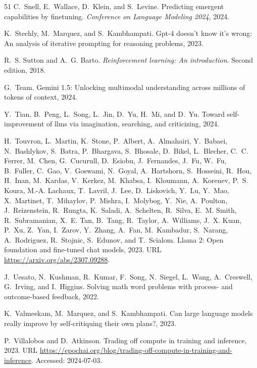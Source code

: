 \begin{thebibliography}{51}
C.~Snell, E.~Wallace, D.~Klein, and S.~Levine.
\newblock Predicting emergent capabilities by finetuning.
\newblock \emph{Conference on Language Modeling 2024}, 2024.

K.~Stechly, M.~Marquez, and S.~Kambhampati.
\newblock Gpt-4 doesn't know it's wrong: An analysis of iterative prompting for reasoning problems, 2023.

R.~S. Sutton and A.~G. Barto.
\newblock \emph{Reinforcement learning: An introduction}.
\newblock Second edition, 2018.

G.~Team.
\newblock Gemini 1.5: Unlocking multimodal understanding across millions of tokens of context, 2024.

Y.~Tian, B.~Peng, L.~Song, L.~Jin, D.~Yu, H.~Mi, and D.~Yu.
\newblock Toward self-improvement of llms via imagination, searching, and criticizing, 2024.

H.~Touvron, L.~Martin, K.~Stone, P.~Albert, A.~Almahairi, Y.~Babaei, N.~Bashlykov, S.~Batra, P.~Bhargava, S.~Bhosale, D.~Bikel, L.~Blecher, C.~C. Ferrer, M.~Chen, G.~Cucurull, D.~Esiobu, J.~Fernandes, J.~Fu, W.~Fu, B.~Fuller, C.~Gao, V.~Goswami, N.~Goyal, A.~Hartshorn, S.~Hosseini, R.~Hou, H.~Inan, M.~Kardas, V.~Kerkez, M.~Khabsa, I.~Kloumann, A.~Korenev, P.~S. Koura, M.-A. Lachaux, T.~Lavril, J.~Lee, D.~Liskovich, Y.~Lu, Y.~Mao, X.~Martinet, T.~Mihaylov, P.~Mishra, I.~Molybog, Y.~Nie, A.~Poulton, J.~Reizenstein, R.~Rungta, K.~Saladi, A.~Schelten, R.~Silva, E.~M. Smith, R.~Subramanian, X.~E. Tan, B.~Tang, R.~Taylor, A.~Williams, J.~X. Kuan, P.~Xu, Z.~Yan, I.~Zarov, Y.~Zhang, A.~Fan, M.~Kambadur, S.~Narang, A.~Rodriguez, R.~Stojnic, S.~Edunov, and T.~Scialom.
\newblock Llama 2: Open foundation and fine-tuned chat models, 2023.
\newblock URL \url{https://arxiv.org/abs/2307.09288}.

J.~Uesato, N.~Kushman, R.~Kumar, F.~Song, N.~Siegel, L.~Wang, A.~Creswell, G.~Irving, and I.~Higgins.
\newblock Solving math word problems with process- and outcome-based feedback, 2022.

K.~Valmeekam, M.~Marquez, and S.~Kambhampati.
\newblock Can large language models really improve by self-critiquing their own plans?, 2023.

P.~Villalobos and D.~Atkinson.
\newblock Trading off compute in training and inference, 2023.
\newblock URL \url{https://epochai.org/blog/trading-off-compute-in-training-and-inference}.
\newblock Accessed: 2024-07-03.


\end{thebibliography}
